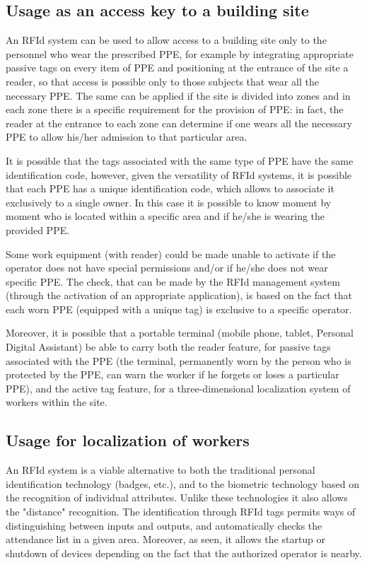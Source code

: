 \subsection[Usage as an access key to a building site]{Usage as an access key to a building site}
An RFId system can be used to allow access to a building site only to the personnel who wear the prescribed PPE, for example by integrating appropriate passive tags on every item of PPE and positioning at the entrance of the site a reader, so that access is possible only to those subjects that wear all the necessary PPE. The same can be applied if the site is divided into zones and in each zone there is a specific requirement for the provision of PPE: in fact, the reader at the entrance to each zone can determine if one wears all the necessary PPE to allow his/her admission to that particular area. 

\vspace*{1pc}
It is possible that the tags associated with the same type of PPE have the same identification code, however, given the versatility of RFId systems, it is possible that each PPE has a unique identification code, which allows to associate it exclusively to a single owner. In this case it is possible to know moment by moment who is located within a specific area and if he/she is wearing the provided PPE. 

\vspace*{1pc}
Some work equipment (with reader) could be made unable to activate if the operator does not have special permissions and/or if he/she does not wear specific PPE. The check, that can be made by the RFId management system (through the activation of an appropriate application), is based on the fact that each worn PPE (equipped with a unique tag) is exclusive to a specific operator. 

\vspace*{1pc}
Moreover, it is possible that a portable terminal (mobile phone, tablet, Personal Digital Assistant) be able to carry both the reader feature, for passive tags associated with the PPE (the terminal, permanently worn by the person who is protected by the PPE, can warn the worker if he forgets or loses a particular PPE), and the active tag feature, for a three-dimensional localization system of workers within the site.

\subsection[Usage for localization of workers]{Usage for localization of workers} 
An RFId system is a viable alternative to both the traditional personal identification technology (badges, etc.), and to the biometric technology based on the recognition of individual attributes. Unlike these technologies it also allows the "distance" recognition. The identification through RFId tags permits ways of distinguishing between inputs and outputs, and automatically checks the attendance list in a given area. Moreover, as seen, it allows the startup or shutdown of devices depending on the fact that the authorized operator is nearby. 

